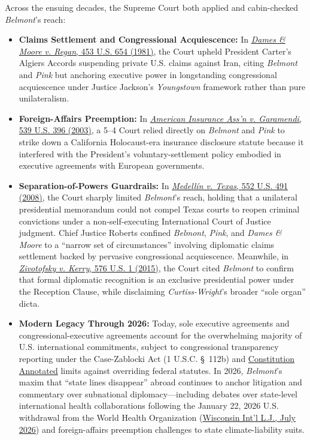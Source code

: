 \documentclass[12pt]{article}
\begin{document}
Across the ensuing decades, the Supreme Court both applied and cabin-checked \textit{Belmont}'s reach:
\begin{itemize}
  \item \textbf{Claims Settlement and Congressional Acquiescence:} In \href{https://supreme.justia.com/cases/federal/us/453/654/}{\textit{Dames \& Moore v. Regan}, 453 U.S. 654 (1981)}, the Court upheld President Carter's Algiers Accords suspending private U.S. claims against Iran, citing \textit{Belmont} and \textit{Pink} but anchoring executive power in longstanding congressional acquiescence under Justice Jackson's \textit{Youngstown} framework rather than pure unilateralism.
  \item \textbf{Foreign-Affairs Preemption:} In \href{https://supreme.justia.com/cases/federal/us/539/396/}{\textit{American Insurance Ass'n v. Garamendi}, 539 U.S. 396 (2003)}, a 5--4 Court relied directly on \textit{Belmont} and \textit{Pink} to strike down a California Holocaust-era insurance disclosure statute because it interfered with the President's voluntary-settlement policy embodied in executive agreements with European governments.
  \item \textbf{Separation-of-Powers Guardrails:} In \href{https://supreme.justia.com/cases/federal/us/552/491/}{\textit{Medell\'in v. Texas}, 552 U.S. 491 (2008)}, the Court sharply limited \textit{Belmont}'s reach, holding that a unilateral presidential memorandum could not compel Texas courts to reopen criminal convictions under a non-self-executing International Court of Justice judgment. Chief Justice Roberts confined \textit{Belmont}, \textit{Pink}, and \textit{Dames \& Moore} to a ``narrow set of circumstances'' involving diplomatic claims settlement backed by pervasive congressional acquiescence. Meanwhile, in \href{https://supreme.justia.com/cases/federal/us/576/1/}{\textit{Zivotofsky v. Kerry}, 576 U.S. 1 (2015)}, the Court cited \textit{Belmont} to confirm that formal diplomatic recognition is an exclusive presidential power under the Reception Clause, while disclaiming \textit{Curtiss-Wright}'s broader ``sole organ'' dicta.
  \item \textbf{Modern Legacy Through 2026:} Today, sole executive agreements and congressional-executive agreements account for the overwhelming majority of U.S. international commitments, subject to congressional transparency reporting under the Case-Zablocki Act (1 U.S.C. \S~112b) and \href{https://www.law.cornell.edu/constitution-conan/article-2/section-2/clause-3/legal-effect-of-executive-agreements}{Constitution Annotated} limits against overriding federal statutes. In 2026, \textit{Belmont}'s maxim that ``state lines disappear'' abroad continues to anchor litigation and commentary over subnational diplomacy---including debates over state-level international health collaborations following the January 22, 2026 U.S. withdrawal from the World Health Organization (\href{https://wilj.org/2026/07/21/in-international-affairs-the-state-of-california-kind-of-exists/}{Wisconsin Int'l L.J., July 2026}) and foreign-affairs preemption challenges to state climate-liability suits.
\end{itemize}
\end{document}
